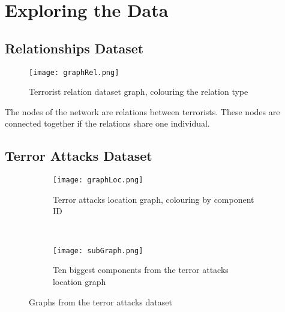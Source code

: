 \section{Exploring the Data}
\label{sec:Exploring the Data}

\subsection{Relationships Dataset}
\label{subsec:Relationships Dataset}

\begin{figure}[H]
\begin{center}

        \texttt{[image: graphRel.png]}
        \label{fig:graphLoc}
        \caption{Terrorist relation dataset graph, colouring the relation type}
        
\end{center}
\end{figure}

The nodes of the network are relations between terrorists. These nodes are connected together if the relations share one individual.

\subsection{Terror Attacks Dataset}
\label{subsec:Terror Attacks Dataset}

\begin{figure}[H]
\begin{center}
    \begin{subfigure}[b]{0.45\textwidth}
        \texttt{[image: graphLoc.png]}
        \caption{Terror attacks location graph, colouring by component ID}
        \label{fig:graphLoc}
    \end{subfigure}
    ~
    \begin{subfigure}[b]{0.45\textwidth}
        \texttt{[image: subGraph.png]}
        \caption{Ten biggest components from the terror attacks location graph}
        \label{fig:subGraph}
    \end{subfigure}
\caption{Graphs from the terror attacks dataset}
\label{fig:graphPlots}
\end{center}
\end{figure}

%
%
%
%

